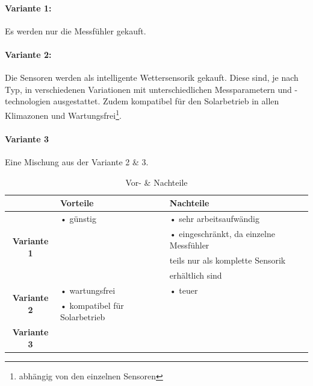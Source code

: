 \paragraph{Variante 1:}

Es werden nur die Messfühler gekauft. \\

\paragraph{Variante 2:}

Die Sensoren werden als intelligente Wettersensorik gekauft. Diese sind, je nach Typ, in verschiedenen Variationen mit unterschiedlichen Messparametern und -technologien ausgestattet. Zudem kompatibel für den Solarbetrieb in allen Klimazonen und Wartungsfrei\footnote{abhängig von den einzelnen Sensoren}.\\

\newpage
\paragraph{Variante 3}

Eine Mischung aus der Variante 2 \& 3.\\

\begin{table}[h]
  \centering
  \label{tab:mcu}
  \small
  \caption{Vor- \& Nachteile}
    \begin{tabular}{c|l|l}
          & \textbf{Vorteile} & \textbf{Nachteile} \\
    \toprule
    \multirow{4}[2]{*}{\textbf{Variante 1}} & • günstig & • sehr arbeitsaufwändig \\
          &  & • eingeschränkt, da einzelne Messfühler \\
          &  & \hspace{0.3cm} teils nur als komplette Sensorik \\
          &  & \hspace{0.3cm} erhältlich sind \\
    \hline
    \multirow{2}[1]{*}{\textbf{Variante 2}} & • wartungsfrei & • teuer \\
          & • kompatibel für Solarbetrieb &  \\
    \hline
    \multirow{4}[1]{*}{\textbf{Variante 3}} &  &  \\
          &       &  \\
          &       &  \\
          &       &  \\
    \end{tabular}%
  \label{tab:sensoren}
\end{table}

